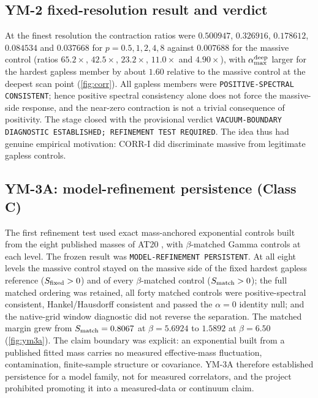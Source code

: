 \documentclass[11pt,a4paper]{article}
\theoremstyle{definition}
\theoremstyle{remark}
\begin{document}
\subsection{YM-2 fixed-resolution result and verdict}
At the finest resolution the contraction ratios were $0.500947$, $0.326916$, $0.178612$, $0.084534$ and $0.037668$ for $p=0.5,1,2,4,8$ against $0.007688$ for the massive control (ratios $65.2\times$, $42.5\times$, $23.2\times$, $11.0\times$ and $4.90\times$), with $\alpha_{\max}^{\rm deep}$ larger for the hardest gapless member by about $1.60$ relative to the massive control at the deepest scan point (\cref{fig:corr}). All gapless members were \texttt{POSITIVE-\allowbreak{}SPECTRAL CONSISTENT}; hence positive spectral consistency alone does not force the massive-side response, and the near-zero contraction is not a trivial consequence of positivity. The stage closed with the provisional verdict \texttt{VACUUM-\allowbreak{}BOUNDARY DIAGNOSTIC ESTABLISHED; REFINEMENT TEST REQUIRED}. The idea thus had genuine empirical motivation: CORR-I did discriminate massive from legitimate gapless controls.

\subsection{YM-3A: model-refinement persistence (Class C)}
The first refinement test used exact mass-anchored exponential controls built from the eight published masses of AT20 \cite{AT20}, with $\beta$-matched Gamma controls at each level. The frozen result was \texttt{MODEL-\allowbreak{}REFINEMENT PERSISTENT}. At all eight levels the massive control stayed on the massive side of the fixed hardest gapless reference ($S_{\rm fixed}>0$) and of every $\beta$-matched control ($S_{\rm match}>0$); the full matched ordering was retained, all forty matched controls were positive-spectral consistent, Hankel/Hausdorff consistent and passed the $\alpha=0$ identity null; and the native-grid window diagnostic did not reverse the separation. The matched margin grew from $S_{\rm match}=0.8067$ at $\beta=5.6924$ to $1.5892$ at $\beta=6.50$ (\cref{fig:ym3a}). The claim boundary was explicit: an exponential built from a published fitted mass carries no measured effective-mass fluctuation, contamination, finite-sample structure or covariance. YM-3A therefore established persistence for a model family, not for measured correlators, and the project prohibited promoting it into a measured-data or continuum claim.
\end{document}
